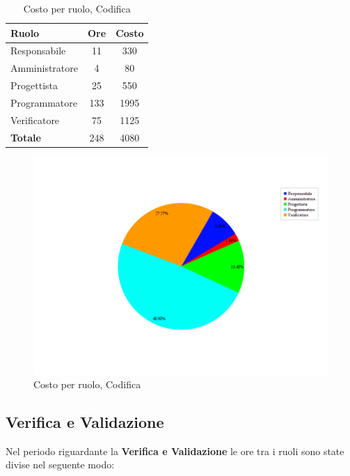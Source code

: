 \begin{table}[H]
	\begin{center}
		\begin{tabular}{|l|c|c|}
			\hline
			\textbf{Ruolo}	& \textbf{Ore} &	\textbf{Costo}	 \\
			\hline
			Responsabile	&	11	&	330		\\
			\hline
			Amministratore	&	4	&	80		\\
			\hline
			Progettista		&	25	&	550		\\
			\hline
			Programmatore	&	133	&	1995	\\
			\hline
			Verificatore	&	75	&	1125	\\
			\hline
			\textbf{Totale}	&	248	&	4080	\\
			\hline
		\end{tabular}
	\end{center}
	\caption{Costo per ruolo, Codifica}
\end{table}

\begin{figure}[H]
	\centering
	\includegraphics[scale=0.4]{immagini/Grafi/CostoCod}
	\caption{Costo per ruolo, Codifica}
\end{figure}

\subsection{Verifica e Validazione}
Nel periodo riguardante la \textbf{Verifica e Validazione} le ore tra i ruoli sono state divise nel seguente modo:

